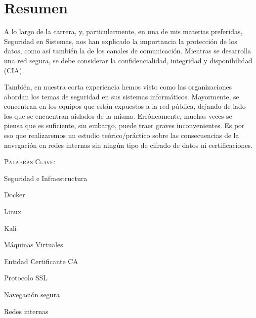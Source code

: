 \thispagestyle{empty}
\chapter*{Resumen}


\bigskip
A lo largo de la carrera, y, particularmente, en una de mis materias preferidas, 
Seguridad en Sistemas, nos han explicado la importancia la protección de los 
datos, como así también la de los canales de comunicación. Mientras se desarrolla 
una red segura, se debe considerar la confidencialidad, integridad y disponibilidad 
(CIA). 

También, en nuestra corta experiencia hemos visto como las organizaciones 
abordan los temas de seguridad en sus sistemas informáticos. Mayormente, se 
concentran en los equipos que están expuestos a la red pública, dejando de 
lado los que se encuentran aislados de la misma. Erróneamente, muchas veces 
se piensa que es suficiente, sin embargo, puede traer graves inconvenientes. 
Es por eso que realizaremos un estudio teórico/práctico sobre las consecuencias 
de la navegación en redes internas sin ningún tipo de cifrado de datos ni 
certificaciones.

\bigskip
\noindent \textsc{Palabras Clave:} \par

Seguridad e Infraestructura\par
Docker \par
Linux \par
Kali \par
Máquinas Virtuales  \par
Entidad Certificante CA \par
Protocolo SSL \par
Navegación segura \par
Redes internas \par


